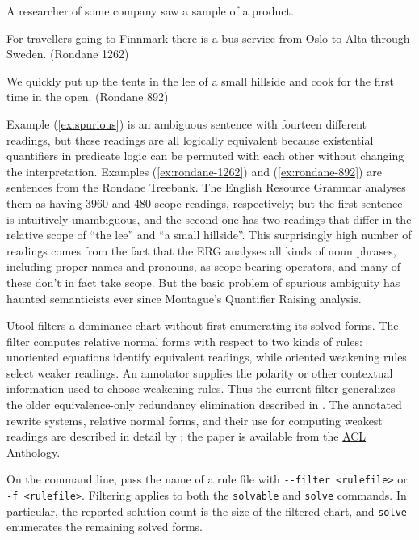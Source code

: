 \begin{examples}
\item \label{ex:spurious}
A researcher of some company saw a sample of a product.
\item
  \label{ex:rondane-1262} 
  For travellers going to Finnmark there is a bus service from Oslo to
  Alta through Sweden. (Rondane 1262)
\item 
  \label{ex:rondane-892}
  We quickly put up the tents in the lee of a small hillside and cook
  for the first time in the open. (Rondane 892)
\end{examples}

Example (\ref{ex:spurious}) is an ambiguous sentence with fourteen
different readings, but these readings are all logically equivalent
because existential quantifiers in predicate logic can be permuted
with each other without changing the interpretation. Examples
(\ref{ex:rondane-1262}) and (\ref{ex:rondane-892}) are sentences from
the Rondane Treebank. The English Resource Grammar analyses them as
having 3960 and 480 scope readings, respectively; but the first
sentence is intuitively unambiguous, and the second one has two
readings that differ in the relative scope of ``the lee'' and ``a
small hillside''. This surprisingly high number of readings comes from
the fact that the ERG analyses all kinds of noun phrases, including
proper names and pronouns, as scope bearing operators, and many of
these don't in fact take scope. But the basic problem of spurious
ambiguity has haunted semanticists ever since Montague's Quantifier
Raising analysis.

Utool filters a dominance chart without first enumerating its solved
forms. The filter computes relative normal forms with respect to two
kinds of rules: unoriented equations identify equivalent readings,
while oriented weakening rules select weaker readings. An annotator
supplies the polarity or other contextual information used to choose
weakening rules. Thus the current filter generalizes the older
equivalence-only redundancy elimination described in \cite{koller06}.
The annotated rewrite systems, relative normal forms, and their use
for computing weakest readings are described in detail by
; the paper is available from the
\href{https://aclanthology.org/P10-1004/}{ACL Anthology}.

On the command line, pass the name of a rule file with
\verb?--filter <rulefile>? or \verb?-f <rulefile>?. Filtering applies
to both the \verb?solvable? and \verb?solve? commands. In particular,
the reported solution count is the size of the filtered chart, and
\verb?solve? enumerates the remaining solved forms.

